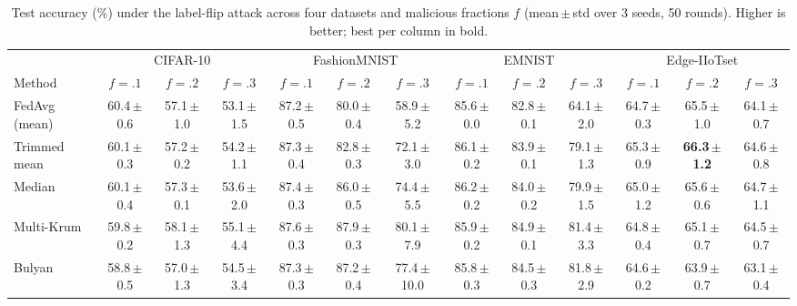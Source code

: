 \begin{table}[t]\centering\footnotesize
\caption{Test accuracy (\%) under the label-flip attack across four datasets and malicious fractions $f$ (mean\,$\pm$\,std over 3 seeds, 50 rounds). Higher is better; best per column in bold.}
\label{tab:labelflip}
\setlength{\tabcolsep}{2.5pt}
\begin{tabular}{@{}lcccccccccccc@{}}\toprule
& \multicolumn{3}{c}{CIFAR-10} & \multicolumn{3}{c}{FashionMNIST} & \multicolumn{3}{c}{EMNIST} & \multicolumn{3}{c}{Edge-IIoTset}\\
\cmidrule(lr){2-4}\cmidrule(lr){5-7}\cmidrule(lr){8-10}\cmidrule(l){11-13}
Method & $f{=}.1$ & $f{=}.2$ & $f{=}.3$ & $f{=}.1$ & $f{=}.2$ & $f{=}.3$ & $f{=}.1$ & $f{=}.2$ & $f{=}.3$ & $f{=}.1$ & $f{=}.2$ & $f{=}.3$\\\midrule
FedAvg (mean)~\cite{mcmahan2017} & 60.4\,{\scriptsize$\pm$0.6} & 57.1\,{\scriptsize$\pm$1.0} & 53.1\,{\scriptsize$\pm$1.5} & 87.2\,{\scriptsize$\pm$0.5} & 80.0\,{\scriptsize$\pm$0.4} & 58.9\,{\scriptsize$\pm$5.2} & 85.6\,{\scriptsize$\pm$0.0} & 82.8\,{\scriptsize$\pm$0.1} & 64.1\,{\scriptsize$\pm$2.0} & 64.7\,{\scriptsize$\pm$0.3} & 65.5\,{\scriptsize$\pm$1.0} & 64.1\,{\scriptsize$\pm$0.7}\\
Trimmed mean~\cite{yin2018} & 60.1\,{\scriptsize$\pm$0.3} & 57.2\,{\scriptsize$\pm$0.2} & 54.2\,{\scriptsize$\pm$1.1} & 87.3\,{\scriptsize$\pm$0.4} & 82.8\,{\scriptsize$\pm$0.3} & 72.1\,{\scriptsize$\pm$3.0} & 86.1\,{\scriptsize$\pm$0.2} & 83.9\,{\scriptsize$\pm$0.1} & 79.1\,{\scriptsize$\pm$1.3} & 65.3\,{\scriptsize$\pm$0.9} & \textbf{66.3\,{\scriptsize$\pm$1.2}} & 64.6\,{\scriptsize$\pm$0.8}\\
Median~\cite{yin2018} & 60.1\,{\scriptsize$\pm$0.4} & 57.3\,{\scriptsize$\pm$0.1} & 53.6\,{\scriptsize$\pm$2.0} & 87.4\,{\scriptsize$\pm$0.3} & 86.0\,{\scriptsize$\pm$0.5} & 74.4\,{\scriptsize$\pm$5.5} & 86.2\,{\scriptsize$\pm$0.2} & 84.0\,{\scriptsize$\pm$0.2} & 79.9\,{\scriptsize$\pm$1.5} & 65.0\,{\scriptsize$\pm$1.2} & 65.6\,{\scriptsize$\pm$0.6} & 64.7\,{\scriptsize$\pm$1.1}\\
Multi-Krum~\cite{blanchard2017} & 59.8\,{\scriptsize$\pm$0.2} & 58.1\,{\scriptsize$\pm$1.3} & 55.1\,{\scriptsize$\pm$4.4} & 87.6\,{\scriptsize$\pm$0.3} & 87.9\,{\scriptsize$\pm$0.3} & 80.1\,{\scriptsize$\pm$7.9} & 85.9\,{\scriptsize$\pm$0.2} & 84.9\,{\scriptsize$\pm$0.1} & 81.4\,{\scriptsize$\pm$3.3} & 64.8\,{\scriptsize$\pm$0.4} & 65.1\,{\scriptsize$\pm$0.7} & 64.5\,{\scriptsize$\pm$0.7}\\
Bulyan~\cite{bulyan} & 58.8\,{\scriptsize$\pm$0.5} & 57.0\,{\scriptsize$\pm$1.3} & 54.5\,{\scriptsize$\pm$3.4} & 87.3\,{\scriptsize$\pm$0.3} & 87.2\,{\scriptsize$\pm$0.4} & 77.4\,{\scriptsize$\pm$10.0} & 85.8\,{\scriptsize$\pm$0.3} & 84.5\,{\scriptsize$\pm$0.3} & 81.8\,{\scriptsize$\pm$2.9} & 64.6\,{\scriptsize$\pm$0.2} & 63.9\,{\scriptsize$\pm$0.7} & 63.1\,{\scriptsize$\pm$0.4}\\

\end{tabular}
\end{table}

